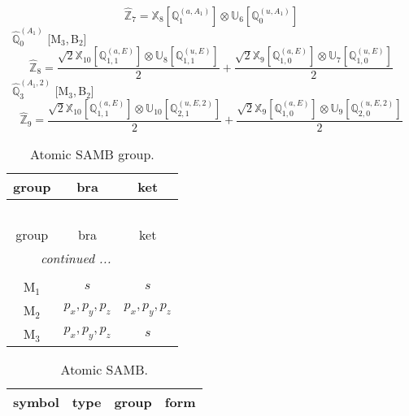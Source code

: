 \documentclass[fleqn,10pt,landscape]{article}
\begin{document}
\begin{itemize}
\begin{dmath*}
\hat{\mathbb{Z}}_{7}=\mathbb{X}_{8}[\mathbb{Q}_{1}^{(a,A_{1})}] \otimes\mathbb{U}_{6}[\mathbb{Q}_{0}^{(u,A_{1})}]
\end{dmath*}
\vspace{4mm}
\noindent {} $\,\,\,\hat{\mathbb{Q}}_{0}^{(A_{1})}$ [M$_{3}$,\,B$_{2}$]
\begin{dmath*}
\hat{\mathbb{Z}}_{8}=\frac{\sqrt{2} \mathbb{X}_{10}[\mathbb{Q}_{1,1}^{(a,E)}] \otimes\mathbb{U}_{8}[\mathbb{Q}_{1,1}^{(u,E)}]}{2} + \frac{\sqrt{2} \mathbb{X}_{9}[\mathbb{Q}_{1,0}^{(a,E)}] \otimes\mathbb{U}_{7}[\mathbb{Q}_{1,0}^{(u,E)}]}{2}
\end{dmath*}
\vspace{4mm}
\noindent {} $\,\,\,\hat{\mathbb{Q}}_{3}^{(A_{1},2)}$ [M$_{3}$,\,B$_{2}$]
\begin{dmath*}
\hat{\mathbb{Z}}_{9}=\frac{\sqrt{2} \mathbb{X}_{10}[\mathbb{Q}_{1,1}^{(a,E)}] \otimes\mathbb{U}_{10}[\mathbb{Q}_{2,1}^{(u,E,2)}]}{2} + \frac{\sqrt{2} \mathbb{X}_{9}[\mathbb{Q}_{1,0}^{(a,E)}] \otimes\mathbb{U}_{9}[\mathbb{Q}_{2,0}^{(u,E,2)}]}{2}
\end{dmath*}
\begin{center}
\renewcommand{\arraystretch}{1.3}
\begin{longtable}{c|c|c}
\caption{Atomic SAMB group.}
 \\
 \hline \hline
group & bra & ket \\ \hline \endfirsthead

\multicolumn{2}{l}{\tablename\ \thetable{}} \\
 \hline \hline
group & bra & ket \\ \hline \endhead

 \hline \hline
\multicolumn{2}{r}{\footnotesize\it continued ...} \\ \endfoot

 \hline \hline
\multicolumn{2}{r}{} \\ \endlastfoot

M$_{1}$ & $s$ & $s$ \\
M$_{2}$ & $p_{x}, p_{y}, p_{z}$ & $p_{x}, p_{y}, p_{z}$ \\
M$_{3}$ & $p_{x}, p_{y}, p_{z}$ & $s$ \\
\end{longtable}
\end{center}
\begin{center}
\renewcommand{\arraystretch}{1.3}
\begin{longtable}{c|c|c|c}
\caption{Atomic SAMB.}
 \\
 \hline \hline
symbol & type & group & form \\ \hline \endfirsthead


\end{longtable}
\end{center}
\end{itemize}
\end{document}
